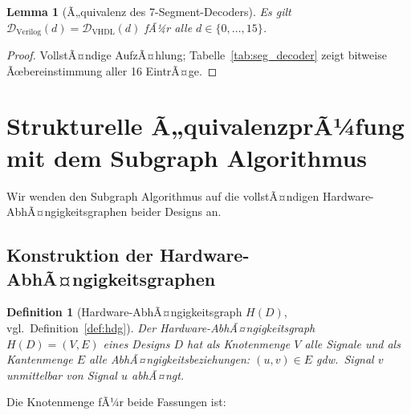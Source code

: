 ﻿\documentclass[12pt,a4paper]{report}
\newtheorem{definition}{Definition}[section]
\newtheorem{lemma}[theorem]{Lemma}
\begin{document}
\begin{lemma}[Ã„quivalenz des 7-Segment-Decoders]
	\label{lem:decoder_equiv}
	Es gilt $\mathcal{D}_\mathrm{Verilog}(d) = \mathcal{D}_\mathrm{VHDL}(d)$
	fÃ¼r alle $d \in \{0,\ldots,15\}$.
\end{lemma}

\begin{proof}
	VollstÃ¤ndige AufzÃ¤hlung; Tabelle~\ref{tab:seg_decoder} zeigt bitweise
	Ãœbereinstimmung aller 16 EintrÃ¤ge.
\end{proof}

\section{Strukturelle Ã„quivalenzprÃ¼fung mit dem Subgraph Algorithmus}
\label{subsec:strukturell_vv}

Wir wenden den Subgraph Algorithmus \cite{subgraph2026} auf die vollstÃ¤ndigen
Hardware-AbhÃ¤ngigkeits\-graphen beider Designs an.

\subsection{Konstruktion der Hardware-AbhÃ¤ngigkeitsgraphen}

\begin{definition}[Hardware-AbhÃ¤ngigkeitsgraph $H(D)$, vgl.\ Definition~\ref{def:hdg}]
	Der Hard\-ware-AbhÃ¤ngigkeitsgraph $H(D) = (V, E)$ eines Designs $D$ hat als
	Knotenmenge $V$ alle Signale und als Kantenmenge $E$ alle
	AbhÃ¤ngigkeitsbeziehungen: $(u, v) \in E$ gdw.\ Signal $v$ unmittelbar von
	Signal $u$ abhÃ¤ngt.
\end{definition}

Die Knotenmenge fÃ¼r beide Fassungen ist:
\end{document}
